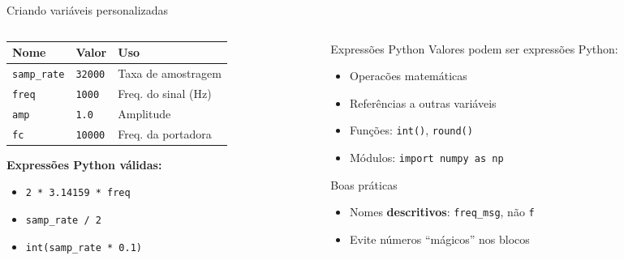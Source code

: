 \documentclass[aspectratio=169]{beamer}
\begin{document}
\begin{frame}{Criando vari\'{a}veis personalizadas}
\begin{columns}
\begin{column}{0.48\textwidth}
  \small
  \begin{tabular}{lll}
    \hline
    \textbf{Nome} & \textbf{Valor} & \textbf{Uso} \\
    \hline
    \texttt{samp\_rate} & \texttt{32000} & Taxa de amostragem \\
    \texttt{freq}       & \texttt{1000}  & Freq. do sinal (Hz) \\
    \texttt{amp}        & \texttt{1.0}   & Amplitude \\
    \texttt{fc}         & \texttt{10000} & Freq. da portadora \\
    \hline
  \end{tabular}

  \vspace{0.2cm}

  \textbf{Express\~{o}es Python v\'{a}lidas:}
  \begin{itemize}\setlength{\itemsep}{1pt}
    \item \texttt{2 * 3.14159 * freq}
    \item \texttt{samp\_rate / 2}
    \item \texttt{int(samp\_rate * 0.1)}
  \end{itemize}
\end{column}
\begin{column}{0.48\textwidth}
  \begin{alertblock}{Express\~{o}es Python}
  \small Valores podem ser express\~{o}es Python:
  \begin{itemize}\setlength{\itemsep}{1pt}
    \item Operac\~{o}es matem\'{a}ticas
    \item Refer\^{e}ncias a outras vari\'{a}veis
    \item Fun\c{c}\~{o}es: \texttt{int()}, \texttt{round()}
    \item M\'{o}dulos: \texttt{import numpy as np}
  \end{itemize}
  \end{alertblock}

  \vspace{0.1cm}

  \begin{exampleblock}{Boas pr\'{a}ticas}
  \small
  \begin{itemize}\setlength{\itemsep}{1pt}
    \item Nomes \textbf{descritivos}: \texttt{freq\_msg}, n\~{a}o \texttt{f}
    \item Evite n\'{u}meros ``m\'{a}gicos'' nos blocos
  \end{itemize}
  \end{exampleblock}
\end{column}
\end{columns}
\end{frame}
\end{document}

